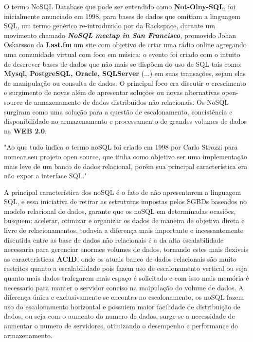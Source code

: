 O termo NoSQL Database que pode ser entendido como \textbf{Not-Olny-SQL}, foi inicialmente anunciado em 1998, para bases de dados que omitiam a linguagem SQL, um termo genérico re-introduzido por \cite{EVANS} da Rackspace,
durante um movimento chamado \textbf{\textit{ NoSQL meetup in San Francisco}}, promovido Johan Oskarsson da \textbf{ Last.fm } um site com objetivo de criar uma rádio online agregando uma comunidade virtual com foco em música; o evento foi criado com o intuito de descrever 
bases de dados que não mais se dispõem do uso de SQL tais como:\textbf{ Mysql, PostgreSQL, Oracle, SQLServer }(...) em suas transações, sejam elas de manipulação ou consulta de dados. O principal foco era discutir o crescimento e surgimento de novas 
além de apresentar soluções ou novas alternativas open-source de armazenamento de dados distribuidos não relacionais. Os NoSQL surgiram como uma solução para a questão de escalonamento, concistência e disponibilidade no
armazenamento e processamento de grandes volumes de dados na \textbf{WEB 2.0}.

"Ao que tudo indica o termo noSQL foi criado em 1998 por Carlo Strozzi para nomear seu projeto open source, que tinha como objetivo ser uma implementação mais leve de um banco de dados relacional, 
porém sua principal característica era não expor a interface SQL."\cite{DEVMEDIA}

A principal característica dos noSQL é o fato de não apresentarem a linguagem SQL, e essa iniciativa de retirar as estruturas impostas pelos SGBDs baseados no modelo relacional de dados, garante que os noSQL em determinadas ocasiões, busquem: acelerar, otimizar e organizar os dados de 
maneira de objetiva direta e livre de relacionamentos, todavia a diferença mais importante e incessantemente discutida entre as base de dados não relacionais é a da alta escalabilidade necessaria para gerenciar enormes volumes de dados, tornando estes mais flexiveis as caracteristicas 
\textbf{ACID}, onde os atuais banco de dados relacionais são muito restritos quanto a escalabilidade pois fazem uso de escalonamento vertical ou seja quanto mais dados trafegarem mais espaço é solicitado e com isso mais memória é necessario para manter o servidor conciso na maipulação 
do volume de dados. A diferença única e exclusivamente se encontra no escalonamento, os noSQL fazem uso do escalonamento horizontal e possuiem maior facilidade de distribuição de dados, ou seja com o aumento do numero de dados, surge-se a necessidade de aumentar o numero de servidores, 
otimizando o desempenho e performance do armazenamento.

